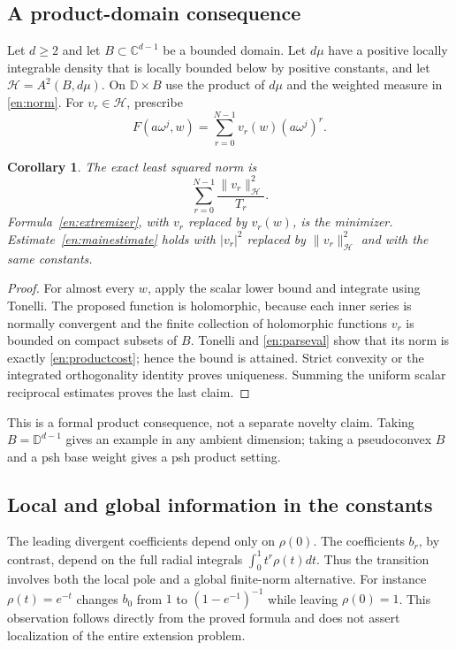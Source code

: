 \documentclass[12pt]{amsart}
\newtheorem{cor}[thm]{Corollary}
\theoremstyle{definition}
\theoremstyle{remark}
\numberwithin{equation}{section}
\newcommand{\cH}{\mathcal{H}}
\newcommand{\C}{\mathbb{C}}
\newcommand{\D}{\mathbb{D}}
\theoremstyle{definition}
\begin{document}
\subsection{A product-domain consequence}
Let $d\ge2$ and let $B\subset\C^{d-1}$ be a bounded domain. Let
$d\mu$ have a positive locally integrable density that is locally
bounded below by positive constants, and let
$\cH=A^2(B,d\mu)$. On $\D\times B$ use the product of $d\mu$ and
the weighted measure in \eqref{en:norm}. For $v_r\in\cH$, prescribe
\[
 F(a\omega^j,w)=\sum_{r=0}^{N-1}v_r(w)(a\omega^j)^r.
\]
\begin{cor}\label{en:product}
The exact least squared norm is
\begin{equation}\label{en:productcost}
 \sum_{r=0}^{N-1}\frac{\|v_r\|_{\cH}^2}{T_r}.
\end{equation}
Formula~\eqref{en:extremizer}, with $v_r$ replaced by $v_r(w)$,
is the minimizer. Estimate~\eqref{en:mainestimate} holds with
$|v_r|^2$ replaced by $\|v_r\|_{\cH}^2$ and with the same constants.
\end{cor}
\begin{proof}
For almost every $w$, apply the scalar lower bound and integrate
using Tonelli. The proposed function is holomorphic, because each
inner series is normally convergent and the finite collection of
holomorphic functions $v_r$ is bounded on compact subsets of $B$.
Tonelli and \eqref{en:parseval} show that its norm is exactly
\eqref{en:productcost}; hence the bound is attained. Strict convexity
or the integrated orthogonality identity proves uniqueness.
Summing the uniform scalar reciprocal estimates proves the last claim.
\end{proof}
This is a formal product consequence, not a separate novelty claim.
Taking $B=\D^{d-1}$ gives an example in any ambient dimension; taking
a pseudoconvex $B$ and a psh base weight gives a psh product setting.

\subsection{Local and global information in the constants}
The leading divergent coefficients depend only on $\rho(0)$.
The coefficients $b_r$, by contrast, depend on the full radial
integrals $\int_0^1t^r\rho(t)dt$. Thus the transition involves both
the local pole and a global finite-norm alternative. For instance
$\rho(t)=e^{-t}$ changes $b_0$ from $1$ to $(1-e^{-1})^{-1}$ while
leaving $\rho(0)=1$. This observation follows directly from the
proved formula and does not assert localization of the entire
extension problem.
\end{document}
